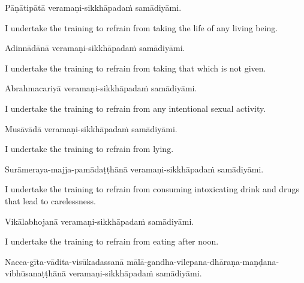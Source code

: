 Pāṇātipātā veramaṇi-sikkhāpadaṁ samādiyāmi.\\

\begin{english}
  I undertake the training to refrain from taking the life of any living being.\\
\end{english}

Adinnādānā veramaṇi-sikkhāpadaṁ samādiyāmi.\\

\begin{english}
  I undertake the training to refrain from taking that which is not given.\\
\end{english}

Abrahmacariyā veramaṇi-sikkhāpadaṁ samādiyāmi.\\

\begin{english}
  I undertake the training to refrain from any intentional sexual activity.\\
\end{english}

Musāvādā veramaṇi-sikkhāpadaṁ samādiyāmi.\\

\begin{english}
  I undertake the training to refrain from lying.\\
\end{english}

Surāmeraya-majja-pamādaṭṭhānā veramaṇi-sikkhāpadaṁ samādiyāmi.\\

\begin{english}
  I undertake the training to refrain from consuming intoxicating drink and drugs that
  lead to carelessness.\\
\end{english}

Vikālabhojanā veramaṇi-sikkhāpadaṁ samādiyāmi.\\

\begin{english}
  I undertake the training to refrain from eating after noon.
\\
  \end{english}

Nacca-gīta-vādita-visūkadassanā mālā-gandha-vilepana-dhāraṇa-maṇḍana-vibhūsanaṭṭhānā veramaṇi-sikkhāpadaṁ samādiyāmi.\\

